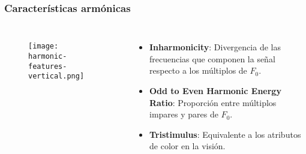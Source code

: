 \begin{frame}
    \frametitle{Características armónicas}

    \begin{columns}

        \begin{figure}[!h]
            \centering
            \texttt{[image: harmonic-features-vertical.png]}
        \end{figure}


        \begin{itemize}
            \item<1-> \textbf{Inharmonicity}: Divergencia de las frecuencias que componen la señal respecto a los múltiplos de $F_0$.
            \item<2-> \textbf{Odd to Even Harmonic Energy Ratio}: Proporción entre múltiplos impares y pares de $F_0$.
            \item<3-> \textbf{Tristimulus}: Equivalente a los atributos de color en la visión.
        \end{itemize}

    \end{columns}
\end{frame}

